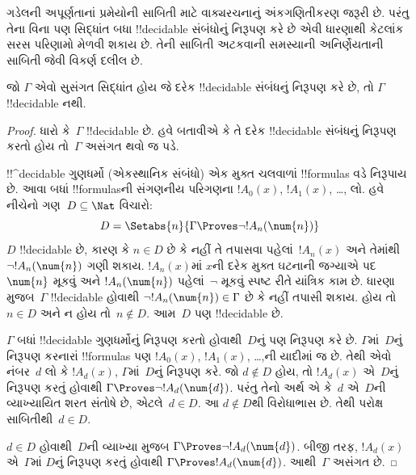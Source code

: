 \documentclass[../../../include/open-logic-section]{subfiles}
\begin{document}


ગડેલની અપૂર્ણતાનાં પ્રમેયોની સાબિતી માટે
વાક્યરચનાનું અંકગણિતીકરણ જરૂરી છે. પરંતુ
તેના વિના પણ સિદ્ધાંત બધા !!{decidable}
સંબંધોનું નિરૂપણ કરે છે એવી ધારણાથી
કેટલાંક સરસ પરિણામો મેળવી શકાય છે. તેની
સાબિતી અટકવાની સમસ્યાની અનિર્ણેયતાની
સાબિતી જેવી વિકર્ણ દલીલ છે.

\begin{thm}
જો $\Gamma$ એવો સુસંગત સિદ્ધાંત હોય જે
દરેક !!{decidable} સંબંધનું નિરૂપણ
કરે છે, તો $\Gamma$ !!{decidable} નથી.
\end{thm}

\begin{proof}
ધારો કે~$\Gamma$ !!{decidable} છે. હવે
બતાવીએ કે તે દરેક !!{decidable} સંબંધનું
નિરૂપણ કરતો હોય તો~$\Gamma$ અસંગત થવો જ
પડે.

!!^{decidable} ગુણધર્મો (એકસ્થાનિક સંબંધો)
એક મુક્ત ચલવાળાં !!{formula}s વડે નિરૂપાય
છે. આવા બધાં !!{formula}sની સંગણનીય પરિગણના
$!A_0(x)$, $!A_1(x)$, \dots, લો. હવે
નીચેનો ગણ~$D \subseteq \Nat$ વિચારો:
\[
D = \Setabs{n}{\Gamma \Proves \lnot !A_n(\num{n})}
\]
$D$ !!{decidable} છે, કારણ કે $n \in D$
છે કે નહીં તે તપાસવા પહેલાં~$!A_n(x)$
અને તેમાંથી~$\lnot !A_n(\num{n})$ ગણી
શકાય. $!A_n(x)$માં $x$ની દરેક મુક્ત
ઘટનાની જગ્યાએ પદ~$\num{n}$ મૂકવું અને
$!A_n(\num{n})$ પહેલાં~$\lnot$ મૂકવું સ્પષ્ટ
રીતે યાંત્રિક કામ છે. ધારણા મુજબ~$\Gamma$
!!{decidable} હોવાથી
$\lnot !A_n(\num{n}) \in \Gamma$ છે કે નહીં
તપાસી શકાય. હોય તો~$n \in D$ અને
ન હોય તો~$n \notin D$. આમ~$D$
પણ !!{decidable} છે.

$\Gamma$ બધાં !!{decidable} ગુણધર્મોનું
નિરૂપણ કરતો હોવાથી~$D$નું પણ
નિરૂપણ કરે છે. $\Gamma$માં~$D$નું
નિરૂપણ કરનારાં !!{formula}s પણ
$!A_0(x)$, $!A_1(x)$, \dots,ની યાદીમાં
જ છે. તેથી એવો નંબર~$d$ લો કે
$!A_d(x)$, $\Gamma$માં~$D$નું
નિરૂપણ કરે. જો $d \notin D$ હોય,
તો $!A_d(x)$ એ~$D$નું નિરૂપણ
કરતું હોવાથી $\Gamma \Proves
\lnot !A_d(\num{d})$. પરંતુ તેનો અર્થ
એ કે~$d$ એ~$D$ની વ્યાખ્યાયિત શરત
સંતોષે છે, એટલે~$d \in D$. આ
$d \notin D$થી વિરોધાભાસ છે. તેથી
પરોક્ષ સાબિતીથી~$d \in D$.

$d \in D$ હોવાથી~$D$ની વ્યાખ્યા મુજબ
$\Gamma \Proves \lnot !A_d(\num{d})$.
બીજી તરફ, $!A_d(x)$ એ~$\Gamma$માં
$D$નું નિરૂપણ કરતું હોવાથી
$\Gamma \Proves !A_d(\num{d})$.
આથી~$\Gamma$ અસંગત છે.
\end{proof}
\end{document}
